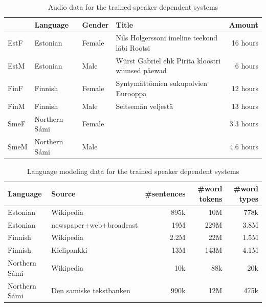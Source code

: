 \documentclass[b5paper]{article}
\newcommand{\ns}{{Northern Sámi }}
\begin{document}
\begin{table}[!h]
\centering
\begin{tabular}{llllr}
 & \textbf{Language} & \textbf{Gender} & \textbf{Title} & \textbf{Amount}\\\hline
EstF & Estonian & Female &Nils Holgerssoni imeline teekond läbi Rootsi  & 16 hours \\
EstM & Estonian & Male & Würst Gabriel ehk Pirita kloostri wiimsed päewad & 6 hours \\
FinF & Finnish & Female & Syntymättömien sukupolvien Eurooppa & 12 hours\\
FinM & Finnish & Male & Seitsemän veljestä & 13 hours\\
SmeF & \ns & Female & & 3.3 hours  \\
SmeM & \ns & Male & & 4.6 hours \\
\end{tabular}
\caption{Audio data for the trained speaker dependent systems\label{tbl:amdatacomp}}
\end{table}

\begin{table}[!h]
\centering
\begin{tabular}{llrrr}
\textbf{Language} & \textbf{Source} & \textbf{\#sentences} & \textbf{ \#word tokens} & \textbf{\#word types}\\\hline
Estonian & Wikipedia &  895k & 10M & 778k \\
 Estonian & newspaper+web+broadcast \cite{kurimo2015modeling} & 19M  & 229M  & 3.8M \\
 Finnish & Wikipedia &  2.2M  & 22M & 1.5M \\
 Finnish & Kielipankki & 13M &  143M & 4.1M \\
 \ns & Wikipedia & 10k & 88k & 20k\\
 \ns & Den samiske tekstbanken & 990k & 12M & 475k\\
\end{tabular}
\caption{Language modeling data for the trained speaker dependent systems\label{tbl:lmdatacomp}}
\end{table}
\end{document}
